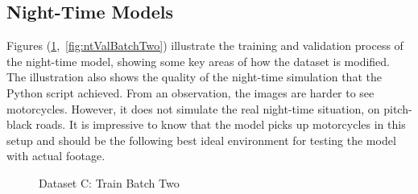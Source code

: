 \documentclass[12pt]{report} %
\begin{document}
		\subsection*{Night-Time Models}
			Figures (\ref{fig:ntTrainBatchTwo},~\ref{fig:ntValBatchTwo}) illustrate the training and validation process of the night-time model, showing some key areas of how the dataset is modified. The illustration also shows the quality of the night-time simulation that the Python script achieved. From an observation, the images are harder to see motorcycles. However, it does not simulate the real night-time situation, on pitch-black roads. It is impressive to know that the model picks up motorcycles in this setup and should be the following best ideal environment for testing the model with actual footage.
			\begin{figure}[hb]
				\begin{floatrow}
					{
						\caption{Dataset C: Train Batch Two}
						\label{fig:ntTrainBatchTwo}
					}
				

\end{floatrow}
\end{figure}
\end{document}
